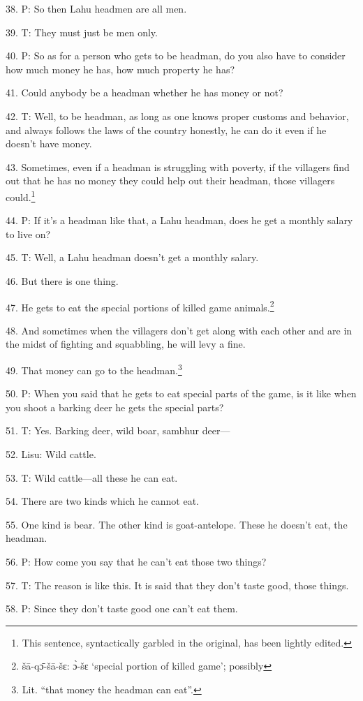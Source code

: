 38. P: So then Lahu headmen are all men.

39. T: They must just be men only.

40. P: So as for a person who gets to be headman, do you also have to consider
how much money he has, how much property he has?

41. Could anybody be a headman whether he has money or not?

42. T: Well, to be headman, as long as one knows proper customs and behavior, and
always follows the laws of the country honestly, he can do it even if he doesn't
have money.

43. Sometimes, even if a headman is struggling with poverty, if the villagers find
out that he has no money they could help out their headman, those villagers could.\footnote{This sentence, syntactically garbled in the original, has been lightly edited.}

44. P: If it's a headman like that, a Lahu headman, does he get a monthly salary
to live on?

45. T: Well, a Lahu headman doesn't get a monthly salary.

46. But there is one thing.

47. He gets to eat the special portions of killed game animals.\footnote{šā-qɔ̄-šā-šɛ: ɔ̀-šɛ `special portion of killed game'; possibly}

48. And sometimes when the villagers don't get along with each other and are in
the midst of fighting and squabbling, he will levy a fine.

49. That money can go to the headman.\footnote{Lit. ``that money the headman can eat''.}

50. P: When you said that he gets to eat special parts of the game, is it like
when you shoot a barking deer he gets the special parts?

51. T: Yes. Barking deer, wild boar, sambhur deer---

52. Lisu: Wild cattle.

53. T: Wild cattle---all these he can eat.

54. There are two kinds which he cannot eat.

55. One kind is bear. The other kind is goat-antelope. These he doesn't eat, the
headman.

56. P: How come you say that he can't eat those two things?

57. T: The reason is like this. It is said that they don't taste good, those things.

58. P: Since they don't taste good one can't eat them.

